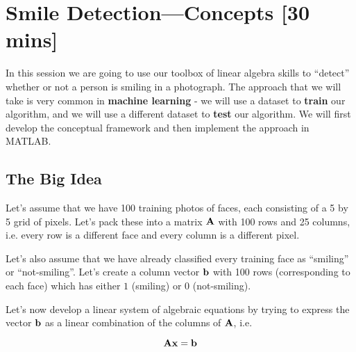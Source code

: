%


\section{Smile Detection---Concepts [30 mins]}

In this session we are going to use our toolbox of linear algebra skills to ``detect'' whether or not a person is smiling in a photograph.  The approach that we will take is very common in \textbf{machine learning} - we will use a dataset to \textbf{train} our algorithm, and we will use a different dataset to \textbf{test} our algorithm. We will first develop the conceptual framework and then implement the approach in MATLAB.

\subsection{The Big Idea}

Let's assume that we have 100 training photos of faces, each consisting of a 5 by 5 grid of pixels. Let's pack these into a matrix $\mathbf{A}$ with 100 rows and 25 columns, i.e. every row is a different face and every column is a different pixel.

Let's also assume that we have already classified every training face as ``smiling'' or ``not-smiling''. Let's create a column vector $\mathbf{b}$ with 100 rows (corresponding to each face) which has either $1$ (smiling) or $0$ (not-smiling).

Let's now develop a linear system of algebraic equations by trying to express the vector $\mathbf{b}$ as a linear combination of the columns of $\mathbf{A}$, i.e.

\[\mathbf{A} \mathbf{x} = \mathbf{b} \]

